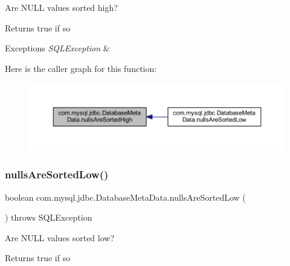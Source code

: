 Are N\+U\+LL values sorted high?

\begin{DoxyReturn}{Returns}
true if so 
\end{DoxyReturn}

\begin{DoxyExceptions}{Exceptions}
{\em S\+Q\+L\+Exception} & \\
\hline
\end{DoxyExceptions}
Here is the caller graph for this function\+:
\nopagebreak
\begin{figure}[H]
\begin{center}
\leavevmode
\includegraphics[width=350pt]{classcom_1_1mysql_1_1jdbc_1_1_database_meta_data_ada8162ea7997c43c5cf2907eceac2142_icgraph}
\end{center}
\end{figure}
\mbox{\label{classcom_1_1mysql_1_1jdbc_1_1_database_meta_data_a706668b3a16fb53d6a1d862ecfb8be09}} 
\subsubsection{\texorpdfstring{nulls\+Are\+Sorted\+Low()}{nullsAreSortedLow()}}
{\footnotesize\ttfamily boolean com.\+mysql.\+jdbc.\+Database\+Meta\+Data.\+nulls\+Are\+Sorted\+Low (\begin{DoxyParamCaption}{ }\end{DoxyParamCaption}) throws S\+Q\+L\+Exception}

Are N\+U\+LL values sorted low?

\begin{DoxyReturn}{Returns}
true if so 
\end{DoxyReturn}

